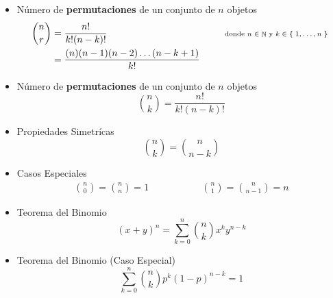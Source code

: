 \documentclass[12pt, fleqn]{report}                             %
\DeclareMathOperator \Space {\quad}                             %
\DeclareMathOperator \MegaSpace {\quad \quad}                   %
\newcommand \Remember[1]{\Space\text{\scriptsize{#1}}}          %
\theoremstyle{break}                                            %
\DeclareMathOperator \Naturals     {\mathbb{N}}                 %
\newcommand{\Set}[1]{\left\{ \; #1 \; \right\}}                 %
\begin{document}
                \begin{itemize}
                    \item 
                        Número de \textbf{permutaciones} de un conjunto de $n$ objetos
                        \begin{align}
                            {n \choose r}
                                &= \frac{n!}{k!(n-k)!} 
                                    &&\Remember{ donde $n \in \Naturals$ y $k \in \Set{1, \dots, n}$ }     \\
                                &= \frac{(n)(n-1)(n-2)\dots(n-k+1)}{k!}
                        \end{align}

                    \item 
                        Número de \textbf{permutaciones} de un conjunto de $n$ objetos
                        \begin{equation}
                            {n \choose k} = \frac{n!}{k!(n-k)!}
                        \end{equation}

                    \item 
                        Propiedades Simetrícas
                        \begin{equation}
                            {n \choose k} = {n \choose n - k}
                        \end{equation}

                    \item 
                        Casos Especiales
                        \begin{align}
                            {n \choose 0} = {n \choose n} = 1
                            \MegaSpace \MegaSpace
                            {n \choose 1} = {n \choose n-1} = n   
                        \end{align}

                    \item 
                        Teorema del Binomio
                        \begin{equation}
                            (x + y)^n 
                                = \sum_{k=0}^n {n \choose k} x^k y^{n-k}
                        \end{equation}


                    \item 
                        Teorema del Binomio (Caso Especial)
                        \begin{equation}
                            \sum_{k=0}^n {n \choose k} p^k (1 - p)^{n-k} = 1
                        \end{equation}

                \end{itemize}
\end{document}
